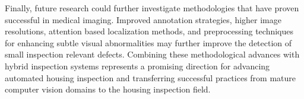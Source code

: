 Finally, future research could further investigate methodologies that have proven successful in medical imaging. Improved annotation strategies, higher image resolutions, attention based localization methods, and preprocessing techniques for enhancing subtle visual abnormalities may further improve the detection of small inspection relevant defects. Combining these methodological advances with hybrid inspection systems represents a promising direction for advancing automated housing inspection and transferring successful practices from mature computer vision domains to the housing inspection field.